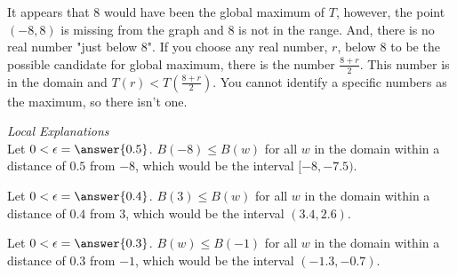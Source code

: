 \documentclass{ximera}
\begin{document}
It appears that $8$ would have been the global maximum of $T$, however, the point $(-8, 8)$ is missing from the graph and $8$ is not in the range.  And, there is no real number "just below $8$".  If you choose any real number, $r$, below $8$ to be the possible candidate for global maximum, there is the number $\frac{8+r}{2}$. This number is in the domain and $T(r) < T\left(\frac{8+r}{2}\right)$.  You cannot identify a specific numbers as the maximum, so there isn't one.




\textit{Local Explanations} \\

Let $0 < \epsilon = \answer{0.5}$.  $B(-8) \leq B(w)$ for all $w$ in the domain within a distance of $0.5$ from $-8$, which would be the interval $[-8, -7.5)$.

Let $0 < \epsilon = \answer{0.4}$.  $B(3) \leq B(w)$ for all $w$ in the domain within a distance of $0.4$ from $3$, which would be the interval $(3.4, 2.6)$.

Let $0 < \epsilon = \answer{0.3}$.  $B(w) \leq B(-1)$ for all $w$ in the domain within a distance of $0.3$ from $-1$, which would be the interval $(-1.3, -0.7)$.
\end{document}
